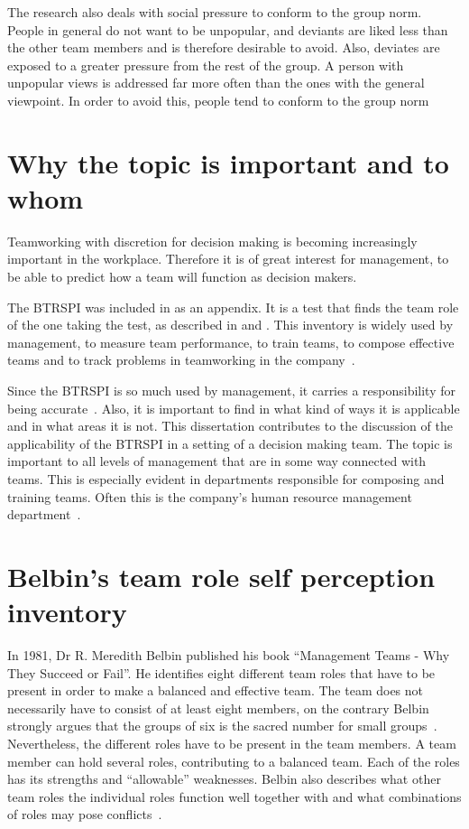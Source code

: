 \documentclass[a4paper,12pt,titlepage]{report}
\begin{document}
  The research also deals with social pressure to conform to the group norm.
  People in general do not want to be unpopular, and  deviants are liked less
  than the other team members and is therefore desirable to avoid.
  Also, deviates are exposed to a greater pressure
  from the rest of the group. A person with unpopular views is addressed far
  more often than the ones with the general viewpoint. In order to avoid this,
  people tend to conform to the group norm~\cite[141-142]{rb}

  \section{Why the topic is important and to whom} 
  Teamworking with discretion for decision making is becoming increasingly important
  in the workplace. Therefore it is of great interest for management,
  to be able to predict how a team will function as decision makers.

  The BTRSPI was included in \citet{rmb} as an appendix. It is a test
  that finds the team role of the one taking the test,
  as described in \citet{rmb} and \citet{rmb2}.
  This inventory is widely used by management, to measure
  team performance, to train teams, to compose effective teams
  and to track problems in teamworking in the company~\cite[41]{af}.

  Since the BTRSPI is so much used by management, it carries a responsibility
  for being accurate~\cite[261]{afhsdp}. Also, it is important to
  find in what kind of ways it is applicable and in what areas it is not.
  This dissertation contributes to the discussion of the
  applicability of the BTRSPI in a setting of a decision making team.
  The topic is important to all levels of management that are in some way
  connected with teams. This is especially evident in departments
  responsible for composing and training teams.
  Often this is the company's human resource management
  department~\citep{fzje}.

  \section{Belbin's team role self perception inventory\label{btrspi}}
  In 1981, Dr R. Meredith Belbin published his
  book ``Management Teams - Why They Succeed or Fail''.
  He identifies eight different team roles that have to be present in order
  to make a balanced and effective team. The team does not necessarily have to consist
  of at least eight members, on the contrary Belbin strongly argues that the
  groups of six is the sacred number for small groups~\cite[115-7]{rmb}.
  Nevertheless, the different
  roles have to be present in the team members. A team member can
  hold several roles, contributing to a balanced team. Each
  of the roles has its strengths and ``allowable'' weaknesses.
  Belbin also describes what other team roles the individual roles function well
  together with and what combinations of roles may pose conflicts~\citep{rmb}.
\end{document}
